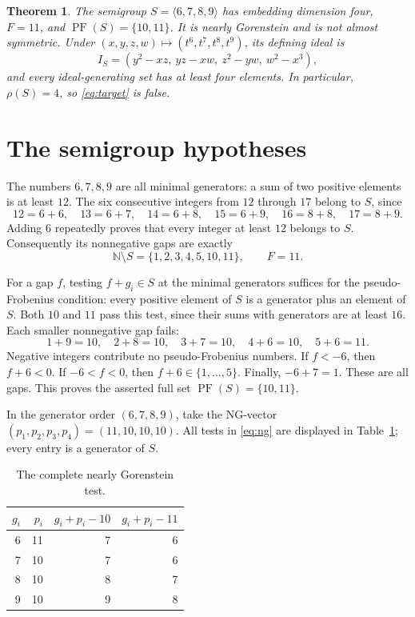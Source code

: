 \documentclass[11pt,a4paper]{article}
\newtheorem{theorem}{Theorem}
\newcommand{\NN}{\mathbb N}
\newcommand{\PF}{\operatorname{PF}}
\begin{document}
\begin{theorem}\label{thm:main}
The semigroup $S=\langle6,7,8,9\rangle$ has embedding dimension four,
$F=11$, and $\PF(S)=\{10,11\}$. It is nearly Gorenstein and is not almost
symmetric. Under $(x,y,z,w)\mapsto(t^6,t^7,t^8,t^9)$, its defining ideal is
\begin{equation}\label{eq:ideal}
 I_S=(y^2-xz,\ yz-xw,\ z^2-yw,\ w^2-x^3),
\end{equation}
and every ideal-generating set has at least four elements. In particular,
$\rho(S)=4$, so \eqref{eq:target} is false.
\end{theorem}

\section{The semigroup hypotheses}
The numbers $6,7,8,9$ are all minimal generators: a sum of two positive
elements is at least $12$. The six consecutive integers from $12$ through
$17$ belong to $S$, since
\[
12=6+6,\quad13=6+7,\quad14=6+8,\quad15=6+9,\quad16=8+8,\quad17=8+9.
\]
Adding $6$ repeatedly proves that every integer at least $12$ belongs to $S$.
Consequently its nonnegative gaps are exactly
\begin{equation}\label{eq:gaps}
 \NN\setminus S=\{1,2,3,4,5,10,11\},\qquad F=11.
\end{equation}

For a gap $f$, testing $f+g_i\in S$ at the minimal generators suffices for
the pseudo-Frobenius condition: every positive element of $S$ is a generator
plus an element of $S$. Both $10$ and $11$ pass this test, since their sums
with generators are at least $16$. Each smaller nonnegative gap fails:
\[
1+9=10,\quad2+8=10,\quad3+7=10,\quad4+6=10,\quad5+6=11.
\]
Negative integers contribute no pseudo-Frobenius numbers. If $f<-6$, then
$f+6<0$. If $-6<f<0$, then $f+6\in\{1,\ldots,5\}$. Finally, $-6+7=1$.
These are all gaps. This proves the asserted full set $\PF(S)=\{10,11\}$.

In the generator order $(6,7,8,9)$, take the NG-vector
$(p_1,p_2,p_3,p_4)=(11,10,10,10)$. All tests in \eqref{eq:ng} are displayed
in Table~\ref{tab:ng}; every entry is a generator of $S$.

\begin{table}[ht]
\centering
\begin{tabular}{rrrr}
\toprule
$g_i$ & $p_i$ & $g_i+p_i-10$ & $g_i+p_i-11$\\
\midrule
6&11&7&6\\
7&10&7&6\\
8&10&8&7\\
9&10&9&8\\
\bottomrule
\end{tabular}
\caption{The complete nearly Gorenstein test.}\label{tab:ng}
\end{table}
\end{document}
